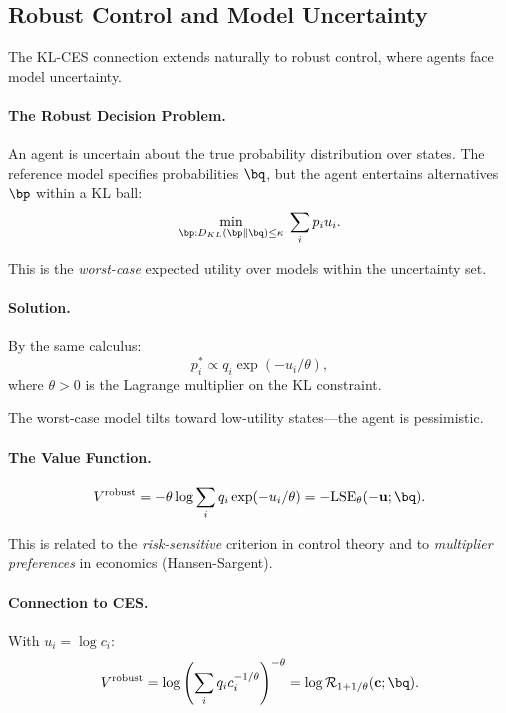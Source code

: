 \subsection{Robust Control and Model Uncertainty}
\label{subsec:ac-adv-robust}

The KL-CES connection extends naturally to robust control, where agents face model uncertainty.

\paragraph{The Robust Decision Problem.}
An agent is uncertain about the true probability distribution over states. The reference model specifies probabilities $\bq$, but the agent entertains alternatives $\bp$ within a KL ball:
\begin{equation}
\min_{\bp: D_{KL}(\bp \| \bq) \leq \kappa} \; \sum_i p_i u_i.
\label{eq:ac-adv-robust}
\end{equation}

This is the \emph{worst-case} expected utility over models within the uncertainty set.

\paragraph{Solution.}
By the same calculus:
\begin{equation}
p_i^* \propto q_i \exp(-u_i / \theta),
\label{eq:ac-adv-robust-solution}
\end{equation}
where $\theta > 0$ is the Lagrange multiplier on the KL constraint.

The worst-case model tilts toward low-utility states---the agent is pessimistic.

\paragraph{The Value Function.}
\begin{equation}
V^{\text{robust}} = -\theta \log \sum_i q_i \exp(-u_i / \theta) = -\text{LSE}_\theta(-\bu; \bq).
\label{eq:ac-adv-robust-value}
\end{equation}

This is related to the \emph{risk-sensitive} criterion in control theory and to \emph{multiplier preferences} in economics (Hansen-Sargent).

\paragraph{Connection to CES.}
With $u_i = \log c_i$:
\begin{equation}
V^{\text{robust}} = \log \left( \sum_i q_i c_i^{-1/\theta} \right)^{-\theta} = \log \CE_{1+1/\theta}(\bc; \bq).
\label{eq:ac-adv-robust-ces}
\end{equation}

